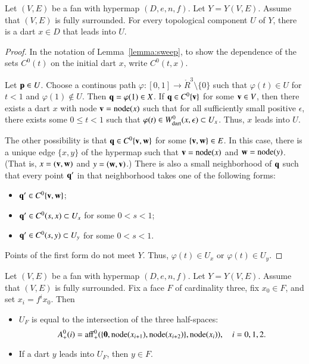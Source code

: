 \begin{lemma}\label{lemma:lead-exists}
Let $(V,E)$ be a fan with hypermap $(D,e,n,f)$. Let
$Y=Y(V,E)$. Assume that $(V,E)$ is fully surrounded.  For every
topological component $U$ of $Y$, there is a dart $x\in D$ that
leads into $U$.
\end{lemma}
%
%
%

\begin{proof}  
In the notation of Lemma~\ref{lemma:sweep}, to show the dependence
of the sets $C^0(t)$ on the initial dart $x$, write $C^0(t,x)$.

Let ${\mathbf p}\in U$.  Choose a continous path $\varphi:[0,1]\to
\ring{R}^3\setminus\{0\}$ such that $\varphi(t)\in U$ for $t<1$ and
$\varphi(1)\not\in U$.  Then ${\mathbf q}=\varphi(1)\in X$.  If ${\mathbf q}\in
C^0\{{\mathbf v}\}$ for some ${\mathbf v}\in V$, then there exists a dart $x$ with
node ${\mathbf v} = {\operatorname{node}}(x)$ such that for all sufficiently small positive
$\epsilon$, there exists some $0\le t < 1$ such that $\varphi(t)\in
W^0_{\text{dart}}(x,\epsilon)\subset U_x$.  Thus, $x$ leads into $U$.
%

The other possibility is that ${\mathbf q}\in C^0\{{\mathbf v},{\mathbf w}\}$ for some
$\{{\mathbf v},{\mathbf w}\}\in E$.  In this case, there is a unique edge $\{x,y\}$ of
the hypermap such that ${\mathbf v}={\operatorname{node}}(x)$ and ${\mathbf w}={\operatorname{node}}(y)$.  (That is,
$x=({\mathbf v},{\mathbf w})$ and $y=({\mathbf w},{\mathbf v})$.)  There is also a small neighborhood of
${\mathbf q}$ such that every point ${\mathbf q}'$ in that neighborhood takes one of
the following forms:
\begin{itemize} \item ${\mathbf q}'\in C^0\{{\mathbf v},{\mathbf w}\}$;
\item ${\mathbf q}'\in C^0(s,x)\subset U_x$ for some $0<s<1$;
\item ${\mathbf q}'\in C^0(s,y)\subset U_y$ for some $0<s<1$.
\end{itemize}
Points of the first form do not meet $Y$.  Thus, $\varphi(t)\in U_x$
or $\varphi(t)\in U_y$.
\end{proof}

\begin{lemma} \label{lemma:triangle}
Let $(V,E)$ be a fan with hypermap $(D,e,n,f)$.  Let $Y=Y(V,E)$.
Assume that $(V,E)$ is fully surrounded. Fix a face $F$ of
cardinality three, fix $x_0\in F$, and set $x_i = f^i x_0$. Then
%
\begin{itemize}  
\item $U_F$ is equal to the intersection of the three half-spaces:
\begin{displaymath}A^0_+(i)={\operatorname{aff}}_+^0(\{{\mathbf 0},{\operatorname{node}}(x_{i+1}),{\operatorname{node}}(x_{i+2})\},{\operatorname{node}}(x_i)),\quad
i=0,1,2.\end{displaymath}
\item If a dart $y$ leads into $U_F$, then $y\in F$.
\end{itemize}
\end{lemma}
%

